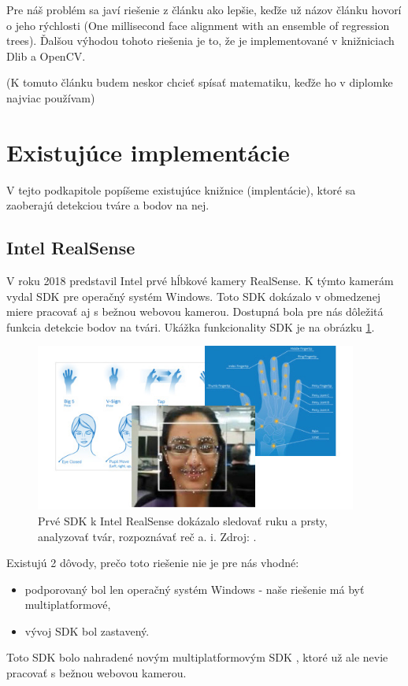 Pre náš problém sa javí riešenie z článku \cite{kazemi2014one} ako lepšie, keďže už názov článku hovorí o jeho rýchlosti (One millisecond face alignment with an ensemble of regression trees). 
Ďalšou výhodou tohoto riešenia je to, že je implementované v knižniciach Dlib a OpenCV.

(K tomuto článku budem neskor chcieť spísať matematiku, keďže ho v diplomke najviac používam)

\section{Existujúce implementácie}
V tejto podkapitole popíšeme existujúce knižnice (implentácie), ktoré sa zaoberajú detekciou tváre a bodov na nej.

\subsection{Intel RealSense}
V roku 2018 predstavil Intel prvé hĺbkové kamery RealSense.
K týmto kamerám vydal SDK \cite{realsensedis} pre operačný systém Windows. 
Toto SDK dokázalo v obmedzenej miere pracovať aj s bežnou webovou kamerou. 
Dostupná bola pre nás dôležitá funkcia detekcie bodov na tvári. 
Ukážka funkcionality SDK je na obrázku \ref{pic-realsensedis}.

\begin{figure}[H]
	\begin{center}
		\includegraphics[height=5.5cm]{pics/realsensedis.jpg}
		\caption{Prvé SDK k Intel RealSense dokázalo sledovať ruku a prsty, analyzovať tvár, rozpoznávať reč a. i.
		Zdroj: \cite{realsensedis}.}
		\label{pic-realsensedis}
	\end{center}
\end{figure}

Existujú 2 dôvody, prečo toto riešenie nie je pre nás vhodné: 
\begin{itemize}
	\item podporovaný bol len operačný systém Windows - naše riešenie má byť multiplatformové,
	\item vývoj SDK bol zastavený.
\end{itemize}
Toto SDK bolo nahradené novým multiplatformovým SDK \cite{realsensenew}, ktoré už ale nevie pracovať s bežnou webovou kamerou. 

